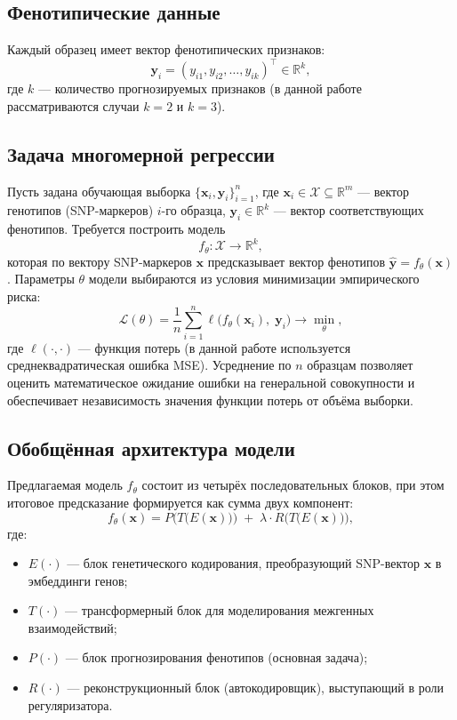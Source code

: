 \subsection{Фенотипические данные}
Каждый образец имеет вектор фенотипических признаков:
\[
\mathbf{y}_i = (y_{i1}, y_{i2}, \dots, y_{ik})^\top \in \mathbb{R}^k,
\]
где \(k\) — количество прогнозируемых признаков (в данной работе 
рассматриваются случаи \(k = 2\) и \(k = 3\)).

\subsection{Задача многомерной регрессии}

Пусть задана обучающая выборка \(\{\mathbf{x}_i, \mathbf{y}_i\}_{i=1}^n\), где
\(\mathbf{x}_i \in \mathcal{X} \subseteq \mathbb{R}^m\) — вектор генотипов
(SNP-маркеров) \(i\)-го образца, \(\mathbf{y}_i \in \mathbb{R}^k\) — вектор
соответствующих фенотипов. Требуется построить модель
\[
f_\theta: \mathcal{X} \to \mathbb{R}^k,
\]
которая по вектору SNP-маркеров \(\mathbf{x}\) предсказывает вектор
фенотипов \(\hat{\mathbf{y}} = f_\theta(\mathbf{x})\). Параметры
\(\theta\) модели выбираются из условия минимизации эмпирического риска:
\[
\mathcal{L}(\theta) = \frac{1}{n} \sum_{i=1}^{n} \ell\bigl(f_\theta(\mathbf{x}_i),\; \mathbf{y}_i\bigr) \to \min_{\theta},
\]
где \(\ell(\cdot, \cdot)\) — функция потерь (в данной работе используется
среднеквадратическая ошибка MSE). Усреднение по \(n\) образцам позволяет
оценить математическое ожидание ошибки на генеральной совокупности и
обеспечивает независимость значения функции потерь от объёма выборки.

\subsection{Обобщённая архитектура модели}

Предлагаемая модель \(f_\theta\) состоит из четырёх последовательных
блоков, при этом итоговое предсказание формируется как сумма двух
компонент:
\[
f_\theta(\mathbf{x}) = P\bigl(T\bigl(E(\mathbf{x})\bigr)\bigr) \;+\; \lambda \cdot R\bigl(T\bigl(E(\mathbf{x})\bigr)\bigr),
\]
где:
\begin{itemize}
	\item \(E(\cdot)\) — блок генетического кодирования, преобразующий
	SNP-вектор \(\mathbf{x}\) в эмбеддинги генов;
	\item \(T(\cdot)\) — трансформерный блок для моделирования межгенных
	взаимодействий;
	\item \(P(\cdot)\) — блок прогнозирования фенотипов (основная задача);
	\item \(R(\cdot)\) — реконструкционный блок (автокодировщик),
	выступающий в роли регуляризатора.
\end{itemize}

